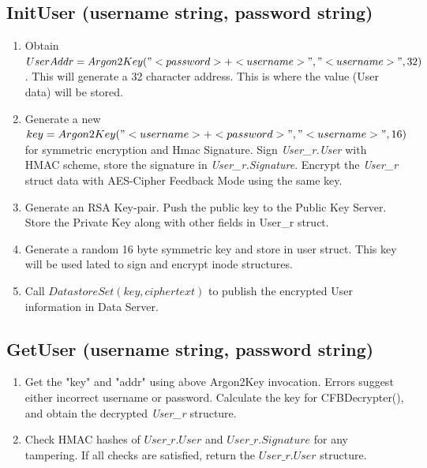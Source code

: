 \documentclass[a4paper, 12pt]{scrartcl}
\begin{document}
\subsection{InitUser (username string, password string)}
\begin{enumerate}
	\itemsep0em

    \item Obtain $UserAddr = Argon2Key("<password>+<username>", "<username>", 32)$. This will generate a 32 character address. This is where the value (User data) will be stored.
    \item Generate a new $key = Argon2Key("<username>+<password>", "<username>", 16)$ for symmetric encryption and Hmac Signature. Sign \textit{User\_r.User} with HMAC scheme, store the signature in \textit{User\_r.Signature}. Encrypt the \textit{User\_r} struct data with AES-Cipher Feedback Mode using the same key.
	\item Generate an RSA Key-pair. Push the public key to the Public Key Server. Store the Private Key along with other fields in User\_r struct.
    \item Generate a random 16 byte symmetric key and store in user struct. This key will be used lated to sign and encrypt inode structures.
	\item Call $DatastoreSet(key, ciphertext)$ to publish the encrypted User information in Data Server.
\end{enumerate}

\subsection{GetUser (username string, password string)}
\begin{enumerate}
	\itemsep0em

	\item Get the "key" and "addr" using above Argon2Key invocation. Errors suggest either incorrect username or password. Calculate the key for CFBDecrypter(), and obtain the decrypted \textit{User\_r} structure.
	\item Check HMAC hashes of $User\_r.User$ and $User\_r.Signature$ for any tampering. If all checks are satisfied, return the $User\_r.User$ structure.
\end{enumerate}
\end{document}
